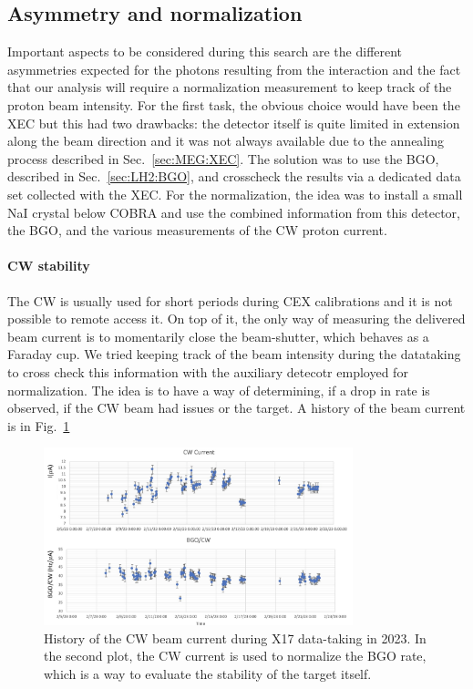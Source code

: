 \begin{refsection}
    \subsection{Asymmetry and normalization}
        Important aspects to be considered during this search are the different asymmetries expected for the photons resulting from the interaction and the fact that our analysis will require a normalization measurement to keep track of the proton beam intensity.
        For the first task, the obvious choice would have been the XEC but this had two drawbacks: the detector itself is quite limited in extension along the beam direction and it was not always available due to the annealing process described in Sec.~\ref{sec:MEG:XEC}.
        The solution was to use the BGO, described in Sec.~\ref{sec:LH2:BGO}, and crosscheck the results via a dedicated data set collected with the XEC.
        For the normalization, the idea was to install a small NaI crystal below COBRA and use the combined information from this detector, the BGO, and the various measurements of the CW proton current.


        \paragraph{CW stability} The CW is usually used for short periods during CEX calibrations and it is not possible to remote access it.
        On top of it, the only way of measuring the delivered beam current is to momentarily close the beam-shutter, which behaves as a Faraday cup.
        We tried keeping track of the beam intensity during the datataking to cross check this information with the auxiliary detecotr employed for normalization.
        The idea is to have a way of determining, if a drop in rate is observed, if the CW beam had issues or the target.
        A history of the beam current is in Fig.~\ref{fig:X17:CW:current}
        \begin{figure}
            \centering
            \includegraphics[width = 0.8\textwidth]{Figures/X17/X17_Feb2023/Stability.pdf}
            \caption{History of the CW beam current during X17 data-taking in 2023. In the second plot, the CW current is used to normalize the BGO rate, which is a way to evaluate the stability of the target itself.}
            \label{fig:X17:CW:current}
        \end{figure}


\end{refsection}
